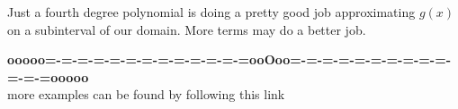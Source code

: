 \documentclass{ximera}
\begin{document}
\begin{center}
\end{center}


Just a fourth degree polynomial is doing a pretty good job approximating $g(x)$ on a subinterval of our domain.  More terms may do a better job.















































\begin{center}
\textbf{\textcolor{green!50!black}{ooooo=-=-=-=-=-=-=-=-=-=-=-=-=ooOoo=-=-=-=-=-=-=-=-=-=-=-=-=ooooo}} \\

more examples can be found by following this link\\ 

\end{center}
\end{document}

